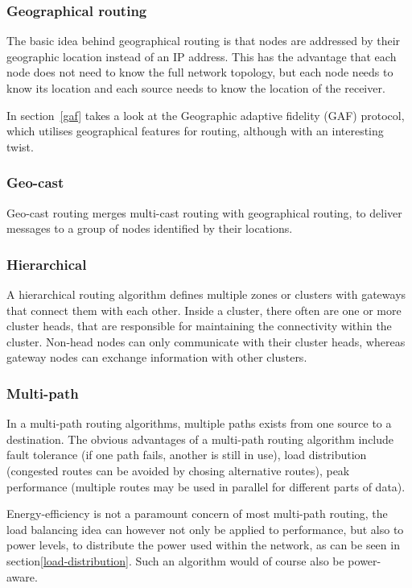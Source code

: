 \subsubsection*{Geographical routing}
The basic idea behind geographical routing is that nodes are addressed by
their geographic location instead of an IP address. This has the advantage
that each node does not need to know the full network topology, but each
node needs to know its location and each source needs to know the location
of the receiver.

In section~\ref{gaf} takes a look at the Geographic adaptive fidelity (GAF)
protocol, which utilises geographical features for routing, although with an
interesting twist.

\subsubsection*{Geo-cast}
Geo-cast routing merges multi-cast routing with geographical routing, to
deliver messages to a group of nodes identified by their locations.

\subsubsection*{Hierarchical}
A hierarchical routing algorithm defines multiple zones or clusters with
gateways that connect them with each other. Inside a cluster, there often
are one or more cluster heads, that are responsible for maintaining the
connectivity within the cluster. Non-head nodes can only communicate with
their cluster heads, whereas gateway nodes can exchange information with
other clusters.


\subsubsection*{Multi-path}
In a multi-path routing algorithms, multiple paths exists from one source
to a destination. The obvious advantages of a multi-path routing
algorithm include fault tolerance (if one path fails, another is still in
use), load distribution (congested routes can be avoided by chosing alternative
routes), peak performance (multiple routes may be used in parallel for different
parts of data).

Energy-efficiency is not a paramount concern of most multi-path routing, the
load balancing idea can however not only be applied to performance, but also
to power levels, to distribute the power used within the network, as can be seen
in section\ref{load-distribution}. Such an algorithm would of course also be power-aware.

